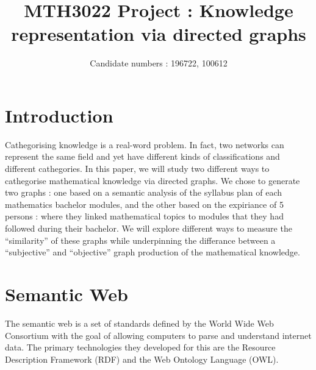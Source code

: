 \documentclass[english, 12pt]{article}
\title{MTH3022 Project : Knowledge representation via directed graphs} %
\author{Candidate numbers : 196722, 100612}
\date{}
\begin{document}
\maketitle
\section{Introduction}
Cathegorising knowledge is a real-word problem. In fact, two networks can represent the same field and yet have different kinds of classifications and different cathegories. In this paper, we will study two different ways to cathegorise mathematical knowledge via directed graphs. We chose to generate two graphs : one based on a semantic analysis of the syllabus plan of each mathematics bachelor modules, and the other based on the expiriance of 5 persons : where they linked mathematical topics to modules that they had followed during their bachelor. We will explore different ways to measure the ``similarity'' of these graphs while underpinning the differance between a ``subjective'' and ``objective'' graph production of the mathematical knowledge.

\section{Semantic Web}
The semantic web is a set of standards defined by the World Wide Web Consortium\cite{w3c_website} with the goal of allowing computers to parse and understand internet data. The primary technologies they developed for this are the Resource Description Framework\cite{w3c_rdf} (RDF) and the Web Ontology Language\cite{w3c_owl} (OWL).
\end{document}
